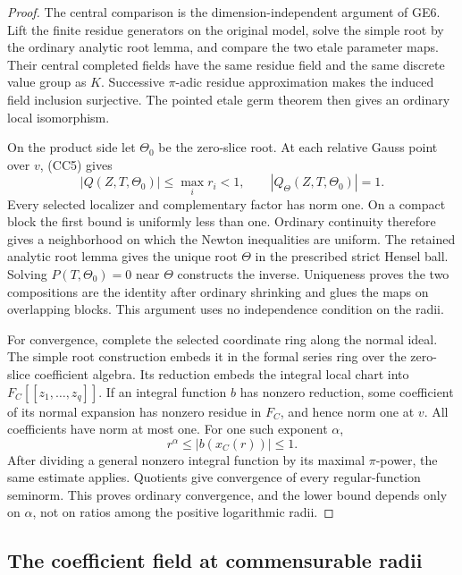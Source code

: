 \begin{proof}
The central comparison is the dimension-independent argument of
GE6.  Lift the finite residue generators on the original model,
solve the simple root by the ordinary analytic root lemma, and
compare the two etale parameter maps.  Their central completed
fields have the same residue field and the same discrete value
group as \(K\).  Successive \(\pi\)-adic residue approximation
makes the induced field inclusion surjective.  The pointed etale
germ theorem then gives an ordinary local isomorphism.

On the product side let \(\Theta_0\) be the zero-slice root.  At
each relative Gauss point over \(v\), (CC5) gives
\[
 |Q(Z,T,\Theta_0)|\leq\max_i r_i<1,
 \qquad |Q_\Theta(Z,T,\Theta_0)|=1.
 \tag{CC8}
\]
Every selected localizer and complementary factor has norm one.
On a compact block the first bound is uniformly less than one.
Ordinary continuity therefore gives a neighborhood on which the
Newton inequalities are uniform.  The retained analytic root
lemma gives the unique root \(\Theta\) in the prescribed strict
Hensel ball.  Solving \(P(T,\Theta_0)=0\) near \(\Theta\)
constructs the inverse.  Uniqueness proves the two compositions
are the identity after ordinary shrinking and glues the maps on
overlapping blocks.  This argument uses no independence condition
on the radii.

For convergence, complete the selected coordinate ring along the
normal ideal.  The simple root construction embeds it in the
formal series ring over the zero-slice coefficient algebra.  Its
reduction embeds the integral local chart into
\(F_C[[z_1,\ldots,z_q]]\).  If an integral function \(b\) has
nonzero reduction, some coefficient of its normal expansion has
nonzero residue in \(F_C\), and hence norm one at \(v\).
All coefficients have norm at most one.  For one such exponent
\(\alpha\),
\[
          r^\alpha\leq |b(x_C(r))|\leq1.
 \tag{CC9}
\]
After dividing a general nonzero integral function by its maximal
\(\pi\)-power, the same estimate applies.  Quotients give
convergence of every regular-function seminorm.  This proves
ordinary convergence, and the lower bound depends only on
\(\alpha\), not on ratios among the positive logarithmic radii.
\end{proof}

\subsection{The coefficient field at commensurable radii}

